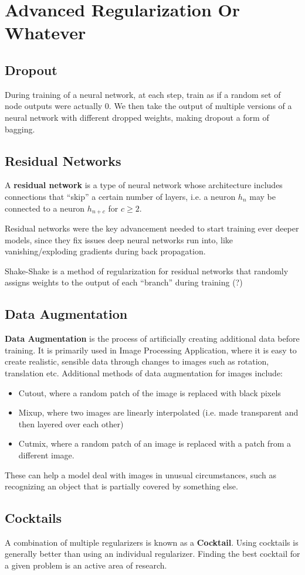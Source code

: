 \documentclass{report}
\newcommand{\tbf}{\textbf}
\newcommand*{\newpar}{\par\vspace{\baselineskip}\noindent}
\begin{document}
\chapter{Advanced Regularization Or Whatever}
\section{Dropout}
During training of a neural network, at each step, train as if a random set of node outputs were actually $0$. We then take the output of multiple versions of a neural network with different dropped weights, making dropout a form of bagging.
%
\section{Residual Networks}
A \tbf{residual network} is a type of neural network whose architecture includes connections that ``skip'' a certain number of layers, i.e. a neuron $h_n$ may be connected to a neuron $h_{n+c}$ for $c \geq 2$.
\newpar
Residual networks were the key advancement needed to start training ever deeper models, since they fix issues deep neural networks run into, like vanishing/exploding gradients during back propagation.
\newpar
Shake-Shake is a method of regularization for residual networks that randomly assigns weights to the output of each ``branch'' during training (?)
%
\section{Data Augmentation}
\tbf{Data Augmentation} is the process of artificially creating additional data before training. It is primarily used in Image Processing Application, where it is easy to create realistic, sensible data through changes to images such as rotation, translation etc. Additional methods of data augmentation for images include:
\begin{itemize}
 \item Cutout, where a random patch of the image is replaced with black pixels
 \item Mixup, where two images are linearly interpolated (i.e. made transparent and then layered over each other)
 \item Cutmix, where a random patch of an image is replaced with a patch from a different image.
\end{itemize}
These can help a model deal with images in unusual circumstances, such as recognizing an object that is partially covered by something else.
%
\section{Cocktails}
A combination of multiple regularizers is known as a \tbf{Cocktail}. Using cocktails is generally better than using an individual regularizer. Finding the best cocktail for a given problem is an active area of research.
%
\end{document}
